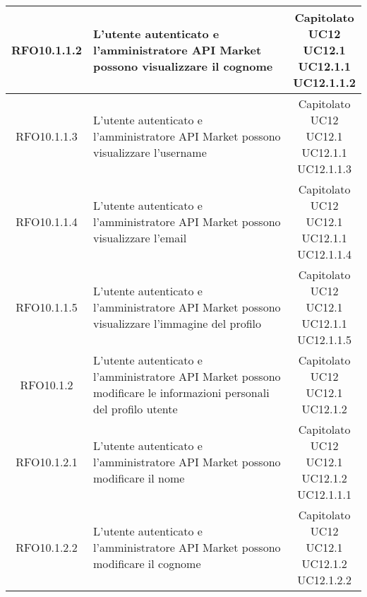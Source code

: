 \begin{longtable}{|c|p{8cm}|c|}
RFO10.1.1.2 &  L'utente autenticato e l'amministratore API Market possono visualizzare il cognome & \makecell*{Capitolato\\UC12\\UC12.1\\UC12.1.1\\UC12.1.1.2} \\
\hline

RFO10.1.1.3 &  L'utente autenticato e l'amministratore API Market possono visualizzare l'username & \makecell*{Capitolato\\UC12\\UC12.1\\UC12.1.1\\UC12.1.1.3} \\
\hline

RFO10.1.1.4 &  L'utente autenticato e l'amministratore API Market possono visualizzare l'email & \makecell*{Capitolato\\UC12\\UC12.1\\UC12.1.1\\UC12.1.1.4} \\
\hline

RFO10.1.1.5 &  L'utente autenticato e l'amministratore API Market possono visualizzare l'immagine del profilo & \makecell*{Capitolato\\UC12\\UC12.1\\UC12.1.1\\UC12.1.1.5} \\
\hline

RFO10.1.2 &  L'utente autenticato e l'amministratore API Market possono modificare le informazioni personali del profilo utente &\makecell*{Capitolato\\UC12\\UC12.1\\UC12.1.2} \\
\hline

RFO10.1.2.1 &  L'utente autenticato e l'amministratore API Market possono modificare il nome & \makecell*{Capitolato\\UC12\\UC12.1\\UC12.1.2\\UC12.1.1.1} \\
\hline

RFO10.1.2.2 &  L'utente autenticato e l'amministratore API Market possono modificare il cognome & \makecell*{Capitolato\\UC12\\UC12.1\\UC12.1.2\\UC12.1.2.2} \\
\hline


\end{longtable}
